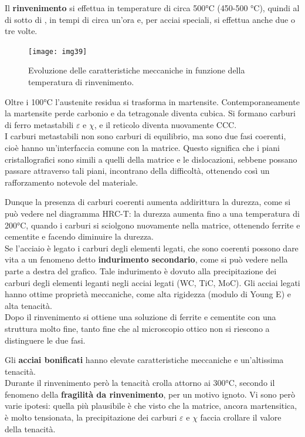 Il \textbf{rinvenimento} si effettua in temperature di circa 500°C (450-500 °C), quindi al di sotto di , in tempi di circa un’ora e, per acciai speciali, si effettua anche due o tre volte.\\

\begin{figure}[!hbt]
    \texttt{[image: img39]}
    \caption{Evoluzione delle caratteristiche meccaniche in funzione della temperatura di rinvenimento.}
\end{figure}

Oltre i 100°C l’austenite residua si trasforma in martensite. Contemporaneamente la martensite perde carbonio e da tetragonale diventa cubica. Si formano carburi di ferro metastabili $\varepsilon$ e $\chi$, e il reticolo diventa nuovamente CCC.\\
I carburi metastabili non sono carburi di equilibrio, ma sono due fasi coerenti, cioè hanno un’interfaccia comune con la matrice. Questo significa che i piani cristallografici sono simili a quelli della matrice e le dislocazioni, sebbene possano passare attraverso tali piani, incontrano della difficoltà, ottenendo così un rafforzamento notevole del materiale.

Dunque la presenza di carburi coerenti aumenta addirittura la durezza, come si può vedere nel diagramma HRC-T: la durezza aumenta fino a una temperatura di 200°C, quando i carburi si sciolgono nuovamente nella matrice, ottenendo ferrite e cementite e facendo diminuire la durezza.\\
Se l’acciaio è legato i carburi degli elementi legati, che sono coerenti possono dare vita a un fenomeno detto \textbf{indurimento secondario}, come si può vedere nella parte a destra del grafico. Tale indurimento è dovuto alla precipitazione dei carburi degli elementi leganti negli acciai legati (WC, TiC, MoC). Gli acciai legati hanno ottime proprietà meccaniche, come alta rigidezza (modulo di Young E) e alta tenacità.\\
Dopo il rinvenimento si ottiene una soluzione di ferrite e cementite con una struttura molto fine, tanto fine che al microscopio ottico non si riescono a distinguere le due fasi.

Gli \textbf{acciai bonificati} hanno elevate caratteristiche meccaniche e un’altissima tenacità.\\
Durante il rinvenimento però la tenacità crolla attorno ai 300°C, secondo il fenomeno della \textbf{fragilità da rinvenimento}, per un motivo ignoto. Vi sono però varie ipotesi: quella più plausibile è che visto che la matrice, ancora martensitica, è molto tensionata, la precipitazione dei carburi $\varepsilon$ e $\chi$ faccia crollare il valore della tenacità.\\

